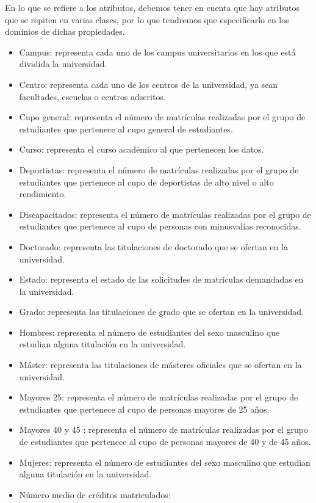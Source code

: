 En lo que se refiere a los atributos, debemos tener en cuenta que hay atributos que se repiten en varias clases, por lo que tendremos que especificarlo en los dominios de dichas propiedades.

\begin{itemize}
		\item Campus: representa cada uno de los campus universitarios en los que está dividida la universidad.
		\item Centro: representa cada uno de los centros de la universidad, ya sean facultades, escuelas o centros adscritos.
		\item Cupo general: representa el número de matrículas realizadas por el grupo de estudiantes que pertenece al cupo general de estudiantes.
		\item Curso: representa el curso académico al que pertenecen los datos.
		\item Deportistas: representa el número de matrículas realizadas por el grupo de estudiantes que pertenece al cupo de deportistas de alto nivel o alto rendimiento.
		\item Discapacitados: representa el número de matrículas realizadas por el grupo de estudiantes que pertenece al cupo de personas con minusvalías reconocidas.
		\item Doctorado: representa las titulaciones de doctorado que se ofertan en la universidad.
		\item Estado: representa el estado de las solicitudes de matrículas demandadas en la universidad.
		\item Grado: representa las titulaciones de grado que se ofertan en la universidad.
		\item Hombres: representa el número de estudiantes del sexo masculino que estudian alguna titulación en la universidad.
		\item Máster: representa las titulaciones de másteres oficiales que se ofertan en la universidad.
		\item Mayores 25: representa el número de matrículas realizadas por el grupo de estudiantes que pertenece al cupo de personas mayores de 25 años.
		\item Mayores 40 y 45 : representa el número de matrículas realizadas por el grupo de estudiantes que pertenece al cupo de personas mayores de 40 y de 45 años.
		\item Mujeres: representa el número de estudiantes del sexo masculino que estudian alguna titulación en la universidad.
		\item Número medio de créditos matriculados:

\end{itemize}
